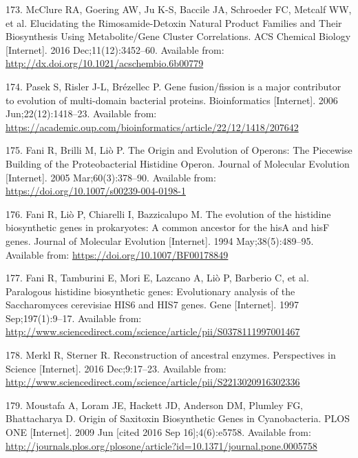 \documentclass[12pt,twoside]{reedthesis}
\begin{document}
  \hypertarget{ref-mcclure_elucidating_2016}{}
  173. McClure RA, Goering AW, Ju K-S, Baccile JA, Schroeder FC, Metcalf
  WW, et al. Elucidating the Rimosamide-Detoxin Natural Product Families
  and Their Biosynthesis Using Metabolite/Gene Cluster Correlations. ACS
  Chemical Biology {[}Internet{]}. 2016 Dec;11(12):3452--60. Available
  from: \url{http://dx.doi.org/10.1021/acschembio.6b00779}
  
  \hypertarget{ref-pasek_gene_2006}{}
  174. Pasek S, Risler J-L, Brézellec P. Gene fusion/fission is a major
  contributor to evolution of multi-domain bacterial proteins.
  Bioinformatics {[}Internet{]}. 2006 Jun;22(12):1418--23. Available from:
  \url{https://academic.oup.com/bioinformatics/article/22/12/1418/207642}
  
  \hypertarget{ref-fani_origin_2005}{}
  175. Fani R, Brilli M, Liò P. The Origin and Evolution of Operons: The
  Piecewise Building of the Proteobacterial Histidine Operon. Journal of
  Molecular Evolution {[}Internet{]}. 2005 Mar;60(3):378--90. Available
  from: \url{https://doi.org/10.1007/s00239-004-0198-1}
  
  \hypertarget{ref-fani_evolution_1994}{}
  176. Fani R, Liò P, Chiarelli I, Bazzicalupo M. The evolution of the
  histidine biosynthetic genes in prokaryotes: A common ancestor for the
  hisA and hisF genes. Journal of Molecular Evolution {[}Internet{]}. 1994
  May;38(5):489--95. Available from:
  \url{https://doi.org/10.1007/BF00178849}
  
  \hypertarget{ref-fani_paralogous_1997}{}
  177. Fani R, Tamburini E, Mori E, Lazcano A, Liò P, Barberio C, et al.
  Paralogous histidine biosynthetic genes: Evolutionary analysis of the
  Saccharomyces cerevisiae HIS6 and HIS7 genes. Gene {[}Internet{]}. 1997
  Sep;197(1):9--17. Available from:
  \url{http://www.sciencedirect.com/science/article/pii/S0378111997001467}
  
  \hypertarget{ref-merkl_reconstruction_2016}{}
  178. Merkl R, Sterner R. Reconstruction of ancestral enzymes.
  Perspectives in Science {[}Internet{]}. 2016 Dec;9:17--23. Available
  from:
  \url{http://www.sciencedirect.com/science/article/pii/S2213020916302336}
  
  \hypertarget{ref-moustafa_origin_2009}{}
  179. Moustafa A, Loram JE, Hackett JD, Anderson DM, Plumley FG,
  Bhattacharya D. Origin of Saxitoxin Biosynthetic Genes in Cyanobacteria.
  PLOS ONE {[}Internet{]}. 2009 Jun {[}cited 2016 Sep 16{]};4(6):e5758.
  Available from:
  \url{http://journals.plos.org/plosone/article?id=10.1371/journal.pone.0005758}
  
\end{document}

